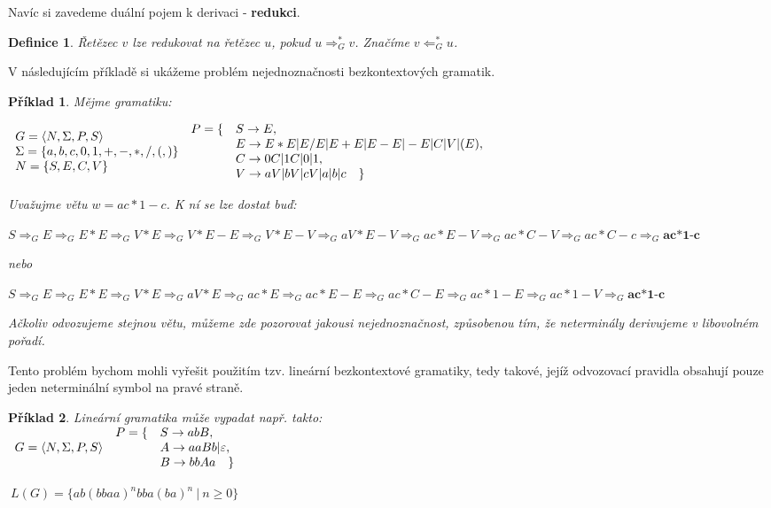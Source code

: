 \documentclass[10pt, a4paper, titlepage]{article}
\theoremstyle{note}
\newtheorem{definice}{Definice}
\newtheorem{priklad}{Příklad}
\begin{document}
Navíc si zavedeme duální pojem k derivaci - \textbf{redukci}.
\begin{definice}
Řetězec $v$ lze redukovat na řetězec $u$, pokud $u \Rightarrow_G^* v$. Značíme
$v \Leftarrow_G^* u$. 
\end{definice}
V následujícím příkladě si ukážeme problém nejednoznačnosti bezkontextových gramatik.
\begin{priklad}\label{priklad-6}
Mějme gramatiku:

$\begin{array}{l}
G=\langle N,\Sigma,P,S \rangle \\
\Sigma = \lbrace a,b,c,0,1,+,-,*,/,(,) \rbrace \\
N = \lbrace S,E,C,V \rbrace \\
\end{array}\\
\begin{array}{l l}
P= \lbrace &S \rightarrow E, \\
& E \rightarrow E*E|E/E|E+E|E-E|-E|C|V|(E), \\
& C \rightarrow 0C|1C|0|1, \\
& V \rightarrow aV|bV|cV|a|b|c \quad \rbrace
\end{array}
$

Uvažujme větu $w=ac*1-c$. K ní se lze dostat buď:

$
S \Rightarrow_G E \Rightarrow_G E*E \Rightarrow_G V*E \Rightarrow_G V*E-E \Rightarrow_G V*E-V \Rightarrow_G aV*E-V \Rightarrow_G ac*E-V \Rightarrow_G ac*C-V \Rightarrow_G ac*C-c \Rightarrow_G \textbf{ac*1-c}
$

nebo

$
S \Rightarrow_G E \Rightarrow_G E*E \Rightarrow_G V*E \Rightarrow_G aV*E \Rightarrow_G ac*E \Rightarrow_G ac*E-E \Rightarrow_G ac*C-E \Rightarrow_G ac*1-E \Rightarrow_G ac*1-V \Rightarrow_G \textbf{ac*1-c}
$

Ačkoliv odvozujeme stejnou větu, můžeme zde pozorovat jakousi nejednoznačnost, způsobenou tím, že neterminály derivujeme v libovolném pořadí.
\end{priklad}
Tento problém bychom mohli vyřešit použitím tzv. lineární bezkontextové gramatiky, tedy takové, jejíž odvozovací pravidla obsahují pouze jeden neterminální symbol na pravé straně.
\begin{priklad}Lineární gramatika může vypadat např. takto: \\
$\begin{array}{l}
G=\langle N,\Sigma,P,S \rangle \\
\end{array}\\
\begin{array}{l l}
P= \lbrace &S \rightarrow abB, \\
& A \rightarrow aaBb|\varepsilon, \\
& B \rightarrow bbAa \quad \rbrace
\end{array}
$

$\ L(G) = \lbrace ab(bbaa)^nbba(ba)^n\ |\ n \ge0 \rbrace$
\end{priklad}
\end{document}
